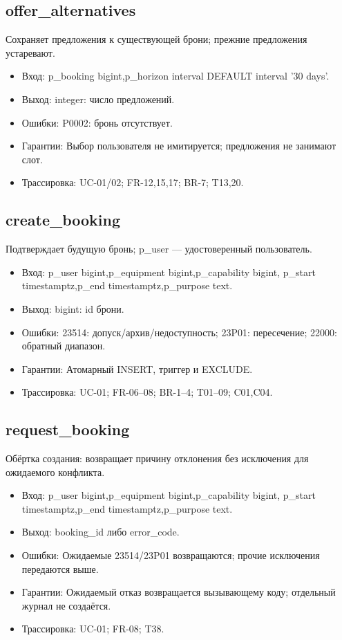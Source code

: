 \subsection{offer\_\allowbreak{}alternatives}
Сохраняет предложения к существующей брони; прежние предложения устаревают.
\begin{itemize}
\item Вход: p\_\allowbreak{}booking bigint,p\_\allowbreak{}horizon interval DEFAULT interval '30 days'.
\item Выход: integer: число предложений.
\item Ошибки: P0002: бронь отсутствует.
\item Гарантии: Выбор пользователя не имитируется; предложения не занимают слот.
\item Трассировка: UC-01/\allowbreak{}02; FR-12,15,17; BR-7; T13,20.
\end{itemize}
\subsection{create\_\allowbreak{}booking}
Подтверждает будущую бронь; p\_\allowbreak{}user — удостоверенный пользователь.
\begin{itemize}
\item Вход: p\_\allowbreak{}user bigint,p\_\allowbreak{}equipment bigint,p\_\allowbreak{}capability bigint,  p\_\allowbreak{}start timestamptz,p\_\allowbreak{}end timestamptz,p\_\allowbreak{}purpose text.
\item Выход: bigint: id брони.
\item Ошибки: 23514: допуск/\allowbreak{}архив/\allowbreak{}недоступность; 23P01: пересечение; 22000: обратный диапазон.
\item Гарантии: Атомарный INSERT, триггер и EXCLUDE.
\item Трассировка: UC-01; FR-06–08; BR-1–4; T01–09; C01,C04.
\end{itemize}
\subsection{request\_\allowbreak{}booking}
Обёртка создания: возвращает причину отклонения без исключения для ожидаемого конфликта.
\begin{itemize}
\item Вход: p\_\allowbreak{}user bigint,p\_\allowbreak{}equipment bigint,p\_\allowbreak{}capability bigint,  p\_\allowbreak{}start timestamptz,p\_\allowbreak{}end timestamptz,p\_\allowbreak{}purpose text.
\item Выход: booking\_\allowbreak{}id либо error\_\allowbreak{}code.
\item Ошибки: Ожидаемые 23514/\allowbreak{}23P01 возвращаются; прочие исключения передаются выше.
\item Гарантии: Ожидаемый отказ возвращается вызывающему коду; отдельный журнал не создаётся.
\item Трассировка: UC-01; FR-08; T38.
\end{itemize}

